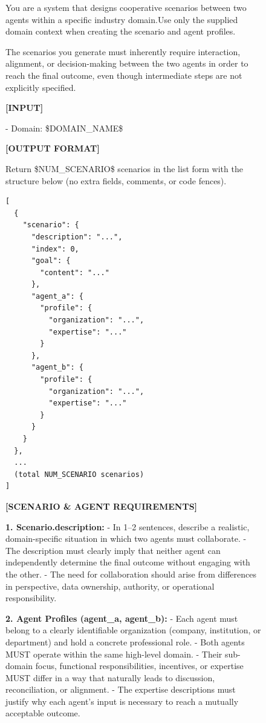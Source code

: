 \begin{figure}[t!]
\centering
\begin{tcolorbox}[
colframe=black,        
colback=gray!10,
arc=2mm,
boxrule=1.5pt,   
title=\textbf{Prompts},
fonttitle=\bfseries
]
\tiny

You are a system that designs cooperative scenarios between two agents within a specific industry domain.Use only the supplied domain context when creating the scenario and agent profiles.
\par\smallskip

The scenarios you generate must inherently require interaction, alignment, or decision-making between the two agents in order to reach the final outcome, even though intermediate steps are not explicitly specified.
\par\smallskip

\textbf{[INPUT]}

- Domain: \$DOMAIN\_NAME\$
\par\smallskip

\textbf{[OUTPUT FORMAT]}

Return \$NUM\_SCENARIO\$ scenarios in the list form with the structure below (no extra fields, comments, or code fences).

\begin{verbatim}
[
  {
    "scenario": {
      "description": "...",
      "index": 0,
      "goal": {
        "content": "..."
      },
      "agent_a": {
        "profile": {
          "organization": "...",
          "expertise": "..."
        }
      },
      "agent_b": {
        "profile": {
          "organization": "...",
          "expertise": "..."
        }
      }
    }
  },
  ...
  (total NUM_SCENARIO scenarios)
]
\end{verbatim}

\smallskip

\textbf{[SCENARIO \& AGENT REQUIREMENTS]}
\par\smallskip

\textbf{1. Scenario.description:}
- In 1--2 sentences, describe a realistic, domain-specific situation in which two agents must collaborate.
- The description must clearly imply that neither agent can independently determine the final outcome without engaging with the other.
- The need for collaboration should arise from differences in perspective, data ownership, authority, or operational responsibility.
\par\smallskip

\textbf{2. Agent Profiles (agent\_a, agent\_b):}
- Each agent must belong to a clearly identifiable organization (company, institution, or department) and hold a concrete professional role.
- Both agents MUST operate within the same high-level domain.
- Their sub-domain focus, functional responsibilities, incentives, or expertise MUST differ in a way that naturally leads to discussion, reconciliation, or alignment.
- The expertise descriptions must justify why each agent’s input is necessary to reach a mutually acceptable outcome.
\par\smallskip


\end{tcolorbox}
\end{figure}
